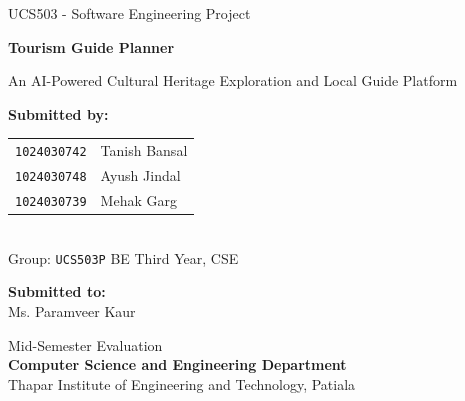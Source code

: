 \documentclass[12pt,a4paper,twoside,openright]{report}
\begin{document}
\begin{titlepage}
\begin{center}
\vspace*{1.5cm}

{\Large UCS503 - Software Engineering Project}

\vspace{2.2cm}

{\Huge\textbf{Tourism Guide Planner}}

\vspace{0.4cm}

{\large An AI-Powered Cultural Heritage Exploration and Local Guide Platform}

\vspace{3.0cm}

{\large\textbf{Submitted by:}}\\[0.4cm]
\begin{tabular}{ll}
\texttt{1024030742} & Tanish Bansal \\
\texttt{1024030748} & Ayush Jindal \\
\texttt{1024030739} & Mehak Garg \\
\end{tabular}\\[0.6cm]
Group: \texttt{UCS503P} BE Third Year, CSE

\vspace{3.0cm}

{\large\textbf{Submitted to:}}\\[0.4cm]
{\large Ms. Paramveer Kaur}

\vfill

{\large Mid-Semester Evaluation}\\[0.25cm]
{\large\textbf{Computer Science and Engineering Department}}\\[0.2cm]
{\large Thapar Institute of Engineering and Technology, Patiala}

\vspace{0.5cm}
\end{center}
\end{titlepage}

\cleardoublepage

\tableofcontents
\end{document}
